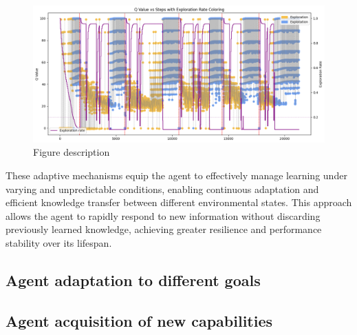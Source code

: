\begin{figure}
    \centering
    \includegraphics[width=0.75\columnwidth]{figures/epsilon.png}
    \caption{Figure description}
    \label{fig:epsilon}
  \end{figure}

These adaptive mechanisms equip the agent to effectively manage learning under varying and unpredictable conditions, enabling continuous adaptation and efficient knowledge transfer between different environmental states. This approach allows the agent to rapidly respond to new information without discarding previously learned knowledge, achieving greater resilience and performance stability over its lifespan. 

\subsection{Agent adaptation to different goals}


\subsection{Agent acquisition of new capabilities}


\endinput

